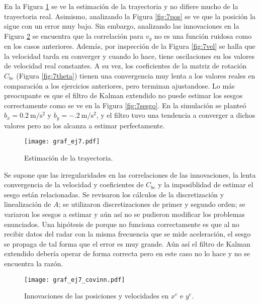 		\pagebreak
		\indent En la Figura \ref{fig:ej7} se ve la estimación de la trayectoria y no difiere mucho de la trayectoria real. Asimismo, analizando la Figura \ref{fig:7pos} se ve que la posición la sigue con un error muy bajo. Sin embargo, analizando las innovaciones en la Figura \ref{fig:7covinn} se encuentra que la correlación para $v_y$ no es una función ruidosa como en los casos anteriores. Además, por inspección de la Figura \ref{fig:7vel} se halla que la velocidad tarda en converger y cuando lo hace, tiene oscilaciones en los valores de velocidad real constantes. A su vez, los coeficientes de la matriz de rotación $C_{be}$ (Figura \ref{fig:7theta}) tienen una convergencia muy lenta a los valores reales en comparación a los ejercicios anteriores, pero terminan ajustandose. Lo más preocupante es que el filtro de Kalman extendido no puede estimar los sesgos correctamente como se ve en la Figura \ref{fig:7sesgo}. En la simulación se planteó $b_x = \SI{0.2}{\metre\per\second\squared}$ y $b_y=\SI{-.2}{\metre\per\second\squared}$, y el filtro tuvo una tendencia a converger a dichos valores pero no los alcanza a estimar perfectamente.\\
\begin{figure}[H]
\centering
\texttt{[image: graf\_ej7.pdf]}
\caption{Estimación de la trayectoria.}
\label{fig:ej7} 
\end{figure}

		\indent Se supone que las irregularidades en las correlaciones de las innovaciones, la lenta convergencia de la velocidad y coeficientes de $C_{be}$ y la imposiblidad de estimar el sesgo están relacionadas. Se revisaron los cálculos de la discretización y linealización de $A$; se utilizaron discretizaciones de primer y segundo orden; se variaron los sesgos a estimar y aún así no se pudieron modificar los problemas enunciados. Una hipótesis de porque no funciona correctamente es que al no recibir datos del radar con la misma frecuencia que se mide aceleración, el sesgo se propaga de tal forma que el error es muy grande. Aún así el filtro de Kalman extendido debería operar de forma correcta pero en este caso no lo hace y no se encuentra la razón.\\
		\pagebreak




\vspace*{\fill}
\begin{figure}[H]
\centering
\texttt{[image: graf\_ej7\_covinn.pdf]}
\caption{Innovaciones de las posiciones y velocidades en $x^e$ e $y^e$.}
\label{fig:7covinn} 
\end{figure}
\vspace*{\fill}


